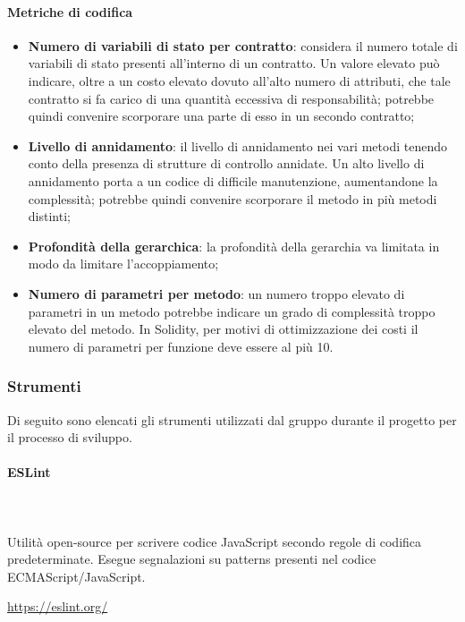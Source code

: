 		\paragraph{Metriche di codifica}
			\begin{itemize}
				\item \textbf{Numero di variabili di stato per contratto}: considera il numero totale di variabili di stato presenti all'interno di un contratto. Un valore elevato può indicare, oltre a un costo elevato dovuto all'alto numero di attributi, che tale contratto si fa carico di una quantità eccessiva di responsabilità; potrebbe quindi convenire scorporare una parte di esso in un secondo contratto;
				\item \textbf{Livello di annidamento}: il livello di annidamento nei vari metodi tenendo	conto della presenza di strutture di controllo annidate.  Un alto livello di annidamento porta a un codice di difficile manutenzione, aumentandone la complessità; potrebbe quindi convenire scorporare il metodo in più metodi distinti;
				\item \textbf{Profondità della gerarchica}: la profondità della gerarchia va limitata in modo da limitare l'accoppiamento;
				\item \textbf{Numero di parametri per metodo}: un numero troppo elevato di parametri in un metodo potrebbe indicare un grado di complessità troppo elevato del metodo. In Solidity\glo, per motivi di ottimizzazione dei costi il numero di parametri per funzione deve essere al più 10.
			\end{itemize}
			
	\subsubsection{Strumenti}
	Di seguito sono elencati gli strumenti utilizzati dal gruppo durante il 
	progetto per il processo di sviluppo.
			
		\paragraph{ESLint} \mbox{}\\ \mbox{}\\
		Utilità open-source per scrivere codice JavaScript secondo regole di codifica 
		predeterminate. Esegue segnalazioni su patterns presenti nel codice 
		ECMAScript/JavaScript.\\
		\centerline{\url{https://eslint.org/}}
				
